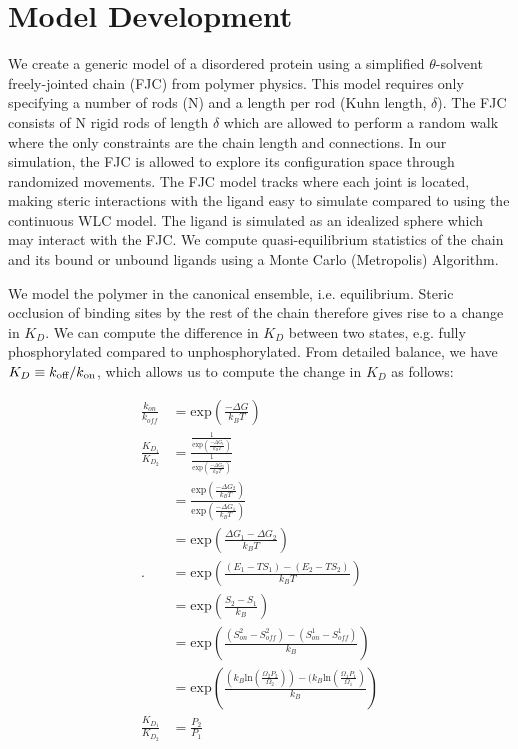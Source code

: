 \documentclass[../AdvancementSummary.tex]{subfiles}
\begin{document}
\section{Model Development}
\label{sec:ModelDev}

We create a generic model of a disordered protein using a simplified $\theta$-solvent freely-jointed chain (FJC) from polymer physics. This model requires only specifying a number of rods (N) and a length per rod (Kuhn length, $\delta$). The FJC consists of N rigid rods of length $\delta$ which are allowed to perform a random walk where the only constraints are the chain length and connections. In our simulation, the FJC is allowed to explore its configuration space through randomized movements. The FJC model tracks where each joint is located, making steric interactions with the ligand easy to simulate compared to using the continuous WLC model. The ligand is simulated as an idealized sphere which may interact with the FJC. We compute quasi-equilibrium statistics of the chain and its bound or unbound ligands using a Monte Carlo (Metropolis) Algorithm. 

We model the polymer in the canonical ensemble, i.e. equilibrium. Steric occlusion of binding sites by the rest of the chain therefore gives rise to a change in $K_D$. We can compute the difference in $K_D$ between two states, e.g. fully phosphorylated compared to unphosphorylated. From detailed balance, we have $K_D \equiv k_{\mbox{\scriptsize off}}/k_{\mbox{\scriptsize on}}$, which allows us to compute the change in $K_D$ as follows: 

\begin{align} 
\frac{k_{on}}{k_{off}} &= \mbox{exp} \left( \frac{-\Delta G}{k_B T}\right) \\
\frac{K_{D_1}}{K_{D_2}} &= \frac{\frac{1}{\mbox{exp} \left( \frac{-\Delta G_1}{k_B T}\right) }}{\frac{1}{\mbox{exp} \left( \frac{-\Delta G_2}{k_B T}\right)}} \\ 
&= \frac{\mbox{exp} \left( \frac{-\Delta G_2}{k_B T} \right)}{\mbox{exp} \left( \frac{-\Delta G_1}{k_B T} \right)} \\
&= \mbox{exp} \left(\frac{\Delta G_1-\Delta G_2}{k_B T}\right) \\. 
&= \mbox{exp} \left( \frac{(E_1-T S_1)-(E_2-T S_2)}{k_B T} \right) \\
&= \mbox{exp} \left(\frac{S_2-S_1}{k_B}\right) \\
&=\mbox{exp}\left(\frac{(S^2_{on}-S^2_{off}) - (S^1_{on}-S^1_{off})}{k_B} \right) \\
&= \mbox{exp} \left( \frac{(k_B \mbox{ln} (\frac{\Omega_2 P_2}{\Omega_2}))-(k_B \mbox{ln}(\frac{\Omega_1 P_1}{\Omega_1})}{k_B} \right) \\
\frac{K_{D_1}}{K_{D_2}} &= \frac{P_2}{P_1}\\
\end{align}  
\end{document}

